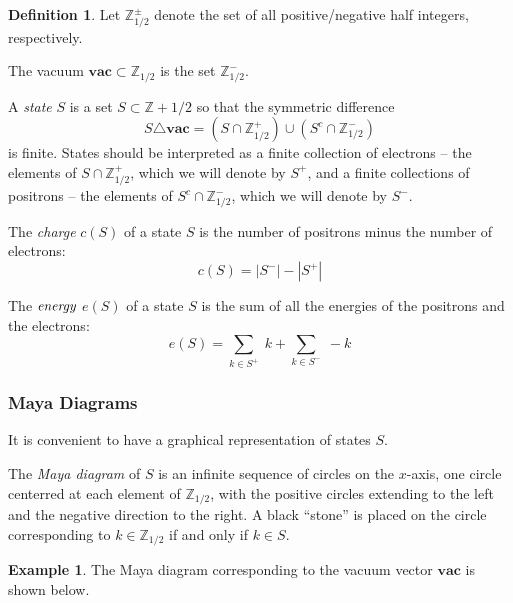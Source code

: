 \documentclass{amsart}[12pt]
\theoremstyle{definition}
\newtheorem{example}[dummy]{Example}
\newtheorem{definition}[dummy]{Definition}
\newcommand{\Z}{\mathbb{Z}}
\newcommand{\vac}{\mathbf{vac}}
\begin{document}
\begin{definition} Let $\Z_{1/2}^\pm$ denote the set of all positive/negative half integers, respectively.

The vacuum $\vac\subset \Z_{1/2}$ is the set $\Z_{1/2}^-$.

A \emph{state} $S$ is a set $S\subset\Z+1/2$ so that the symmetric
difference 
$$S \triangle \vac=(S\cap\Z_{1/2}^+)\cup (S^c\cap\Z_{1/2}^-)$$
 is finite.  States should be interpreted as a finite collection of electrons -- 
the elements of $S\cap \Z^+_{1/2}$, which we will denote by $S^+$, and a finite collections of positrons -- the elements of $S^c\cap \Z^-_{1/2}$, which we will denote by $S^-$.

The \emph{charge} $c(S)$ of a state $S$ is the number of positrons minus the number of electrons:
$$c(S)=| S^-| -| S^+|$$

The $\emph{energy}$ $e(S)$ of a state $S$ is the sum of all the energies of the positrons and the electrons:
$$e(S)=\sum_{k\in S^+}\; k +\sum_{k\in S^-}\; -k$$

\end{definition}

\subsubsection{Maya Diagrams}

It is convenient to have a graphical representation of states $S$.

The \emph{Maya diagram} of $S$ is an infinite sequence of circles on the $x$-axis, one circle centerred at each element of $\Z_{1/2}$, with the positive circles extending to the left and the negative direction to the right.  A black ``stone'' is placed on the
circle corresponding to $k\in\Z_{1/2}$ if and only if $k\in S$.

\begin{example}
The Maya diagram corresponding to the vacuum vector $\vac$ is shown below.
\begin{center}
\end{center}
\end{example}
\end{document}
